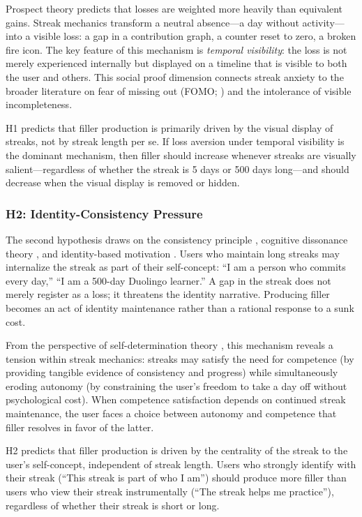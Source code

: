 \documentclass[12pt]{article}
\begin{document}
Prospect theory \citep{Kahneman1979} predicts that losses are weighted more heavily than equivalent gains. Streak mechanics transform a neutral absence---a day without activity---into a visible loss: a gap in a contribution graph, a counter reset to zero, a broken fire icon. The key feature of this mechanism is \emph{temporal visibility}: the loss is not merely experienced internally but displayed on a timeline that is visible to both the user and others. This social proof dimension connects streak anxiety to the broader literature on fear of missing out (FOMO; \citealp{Yu2025}) and the intolerance of visible incompleteness.

H1 predicts that filler production is primarily driven by the visual display of streaks, not by streak length per se. If loss aversion under temporal visibility is the dominant mechanism, then filler should increase whenever streaks are visually salient---regardless of whether the streak is 5 days or 500 days long---and should decrease when the visual display is removed or hidden.

\subsubsection{H2: Identity-Consistency Pressure}
\label{sec:h2-identity}

The second hypothesis draws on the consistency principle \citep{Cialdini1984}, cognitive dissonance theory \citep{Festinger1957}, and identity-based motivation \citep{Oyserman2007}. Users who maintain long streaks may internalize the streak as part of their self-concept: ``I am a person who commits every day,'' ``I am a 500-day Duolingo learner.'' A gap in the streak does not merely register as a loss; it threatens the identity narrative. Producing filler becomes an act of identity maintenance rather than a rational response to a sunk cost.

From the perspective of self-determination theory \citep{Ryan2000}, this mechanism reveals a tension within streak mechanics: streaks may satisfy the need for competence (by providing tangible evidence of consistency and progress) while simultaneously eroding autonomy (by constraining the user's freedom to take a day off without psychological cost). When competence satisfaction depends on continued streak maintenance, the user faces a choice between autonomy and competence that filler resolves in favor of the latter.

H2 predicts that filler production is driven by the centrality of the streak to the user's self-concept, independent of streak length. Users who strongly identify with their streak (``This streak is part of who I am'') should produce more filler than users who view their streak instrumentally (``The streak helps me practice''), regardless of whether their streak is short or long.
\end{document}
